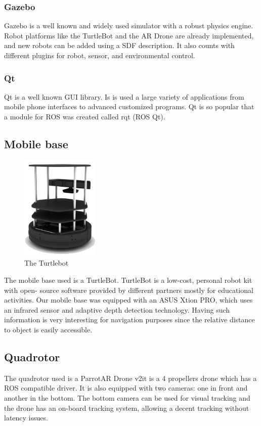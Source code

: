 \documentclass[11pt,a4paper]{article}
\begin{document}
\subsubsection{Gazebo}
Gazebo is a well known and widely used simulator with a robust physics engine. 
Robot platforms like the TurtleBot and the AR Drone are already implemented, and new robots can be added using a SDF description. It also counts with different plugins  for robot, sensor, and environmental control. 

\subsubsection{Qt}
Qt is a well known GUI library. Is is used a large variety of applications from mobile phone interfaces to advanced customized programs. Qt is so popular that a module for ROS was
created called rqt (ROS Qt).


\subsection{Mobile base}
\begin{figure}[ht]	
\centering
\includegraphics[height=5cm]{turtlebot.png}
\caption{The Turtlebot}
\end{figure}

The mobile base used is a TurtleBot. TurtleBot is a low-cost, personal robot kit with open-
source software
provided by different partners mostly for educational activities.
Our mobile base was equipped with an ASUS Xtion PRO, which uses an infrared sensor and adaptive depth detection technology. Having such information is very interesting for 
navigation
purposes since the relative distance to object is easily accessible.


\subsection{Quadrotor}

The quadrotor used is a Parrot\textcopyright AR Drone v2\texttrademark it is a 4 propellers
drone which has a ROS compatible driver. It is also equipped with two cameras: one in front
and another in the bottom. The bottom camera can be used for visual tracking and the drone
has an on-board tracking system, allowing a decent tracking without latency issues.
\end{document}

